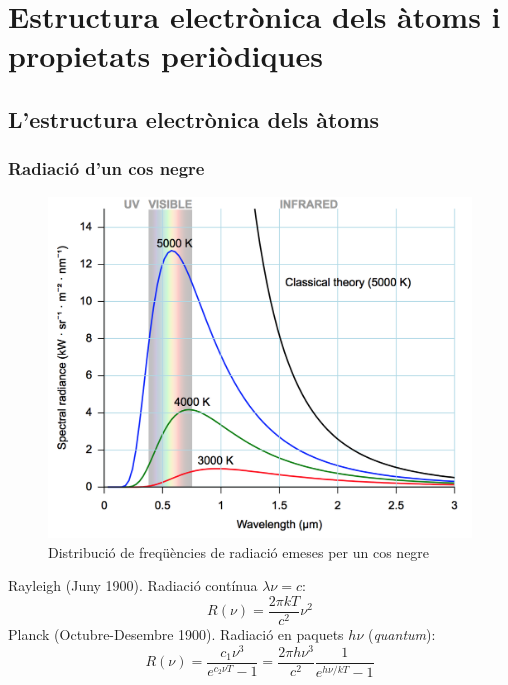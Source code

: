 \chapter{Estructura electrònica dels àtoms i propietats periòdiques}

\section{L'estructura electrònica dels àtoms}
\subsection{Radiació d'un cos negre}
\begin{figure}[h]
\centering
\includegraphics[scale=0.5]{figures/blackbody.png}
\caption{Distribució de freqüències de radiació emeses per un cos negre}
\label{fig:blackbody}
\end{figure}
Rayleigh (Juny 1900). Radiació contínua $\lambda \nu = c$:
\[
R(\nu)=\frac{2 \pi k T}{c^2} \nu^2
\]
Planck (Octubre-Desembre 1900). Radiació en paquets $h\nu$ (\textit{quantum}):
\[
R(\nu)=\frac{c_1 \nu^3}{e^{c_2 \nu T} -1}=\frac{2\pi h \nu^3}{c^2} \frac{1}{e^{h\nu/kT}-1}
\]
